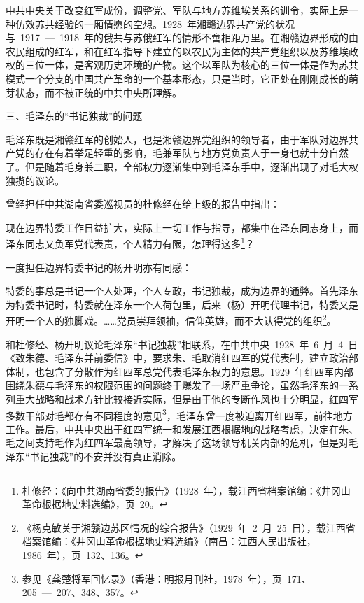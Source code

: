 中共中央关于改变红军成份，调整党、军队与地方苏维埃关系的训令，实际上是一种仿效苏共经验的一厢情愿的空想。1928~年湘赣边界共产党的状况与~1917~—~1918~年的俄共与苏俄红军的情形不啻相距万里。在湘赣边界形成的由农民组成的红军，和在红军指导下建立的以农民为主体的共产党组织以及苏维埃政权的三位一体，是客观历史环境的产物。这个以军队为核心的三位一体是作为苏共模式一个分支的中国共产革命的一个基本形态，只是当时，它正处在刚刚成长的萌芽状态，而不被正统的中共中央所理解。

三、毛泽东的“书记独裁”的问题

毛泽东既是湘赣红军的创始人，也是湘赣边界党组织的领导者，由于军队对边界共产党的存在有着举足轻重的影响，毛兼军队与地方党负责人于一身也就十分自然了。但是随着毛身兼二职，全部权力逐渐集中到毛泽东手中，逐渐出现了对毛大权独揽的议论。

曾经担任中共湖南省委巡视员的杜修经在给上级的报告中指出：

\begin{quoting}
现在边界特委工作日益扩大，实际上一切工作与指导，都集中在泽东同志身上，而泽东同志又负军党代表责，个人精力有限，怎理得这多\footnote{杜修经：《向中共湖南省委的报告》（1928~年），载江西省档案馆编：《井冈山革命根据地史料选编》，页~20。}？
\end{quoting}

一度担任边界特委书记的杨开明亦有同感：

\begin{quoting}
特委的事总是书记一个人处理，个人专政，书记独裁，成为边界的通弊。首先泽东为特委书记时，特委就在泽东一个人荷包里，后来（杨）开明代理书记，特委又是开明一个人的独脚戏。……党员崇拜领袖，信仰英雄，而不大认得党的组织\footnote{《杨克敏关于湘赣边苏区情况的综合报告》（1929~年~2~月~25~日），载江西省档案馆编：《井冈山革命根据地史料选编》（南昌：江西人民出版社，1986~年），页~132、136。}。
\end{quoting}

和杜修经、杨开明议论毛泽东“书记独裁”相联系，在中共中央~1928~年~6~月~4~日《致朱德、毛泽东并前委信》中，要求朱、毛取消红四军的党代表制，建立政治部体制，也包含了分散作为红四军总党代表毛泽东权力的意思。1929~年红四军内部围绕朱德与毛泽东的权限范围的问题终于爆发了一场严重争论，虽然毛泽东的一系列重大战略和战术方针比较接近实际，但是由于他的专断作风也十分明显，红四军多数干部对毛都存有不同程度的意见\footnote{参见《龚楚将军回忆录》（香港：明报月刊社，1978~年），页~171、205~—~207、348、357。}，毛泽东曾一度被迫离开红四军，前往地方工作。最后，中共中央出于红四军统一和发展江西根据地的战略考虑，决定在朱、毛之间支持毛作为红四军最高领导，才解决了这场领导机关内部的危机，但是对毛泽东“书记独裁”的不安并没有真正消除。

